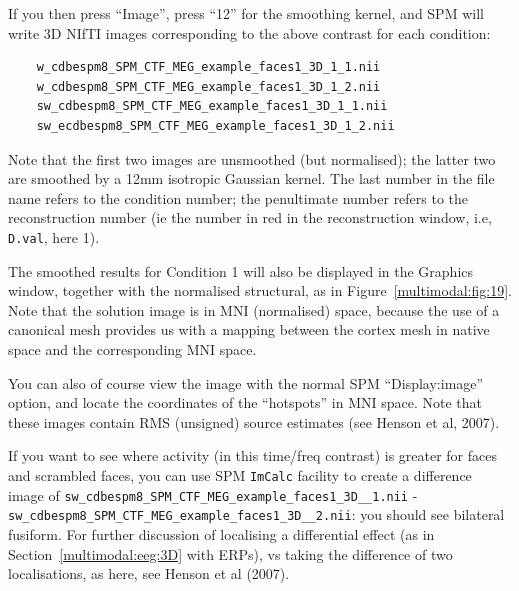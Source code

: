 If you then press ``Image'', press ``12'' for the smoothing kernel, and SPM will write 3D NIfTI images corresponding to the above contrast for each condition:

\begin{verbatim}
    w_cdbespm8_SPM_CTF_MEG_example_faces1_3D_1_1.nii
    w_cdbespm8_SPM_CTF_MEG_example_faces1_3D_1_2.nii
    sw_cdbespm8_SPM_CTF_MEG_example_faces1_3D_1_1.nii
    sw_ecdbespm8_SPM_CTF_MEG_example_faces1_3D_1_2.nii
\end{verbatim}

Note that the first two images are unsmoothed (but normalised); the latter two are smoothed by a 12mm isotropic Gaussian kernel. The last number in the file name refers to the condition number; the penultimate number refers to the reconstruction number (ie the number in red in the reconstruction window, i.e, \texttt{D.val}, here 1).

The smoothed results for Condition 1 will also be displayed in the Graphics window, together with the normalised structural, as in Figure~\ref{multimodal:fig:19}. Note that the solution image is in MNI (normalised) space, because the use of a canonical mesh provides us with a mapping between the cortex mesh in native space and the corresponding MNI space.

You can also of course view the image with the normal SPM ``Display:image'' option, and locate the coordinates of the ``hotspots'' in MNI space. Note that these images contain RMS (unsigned) source estimates (see Henson et al, 2007).

If you want to see where activity (in this time/freq contrast) is greater for faces and scrambled faces, you can use SPM \texttt{ImCalc} facility to create a difference image of \texttt{sw\_\-cdbespm8\_\-SPM\_\-CTF\_\-MEG\_\-example\_\-faces1\_\-3D\_\_\-1.nii} - \texttt{sw\_\-cdbespm8\_\-SPM\_\-CTF\_\-MEG\_\-example\_\-faces1\_\-3D\_\_\-2.nii}: you should see bilateral fusiform. For further discussion of localising a differential effect (as in Section~\ref{multimodal:eeg:3D} with ERPs), vs taking the difference of two localisations, as here, see Henson et al (2007).

